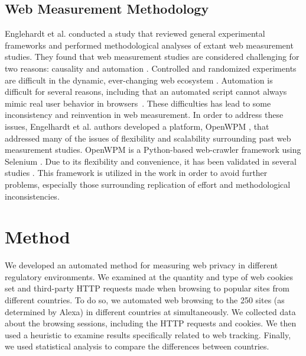 \documentclass[conference]{IEEEtran}
\newcommand{\todo}[1]{}
\renewcommand{\todo}[1]{{\color{red} TODO: {#1}}}
\begin{document}
\subsection{Web Measurement Methodology}
Englehardt et al. conducted a study that reviewed general experimental frameworks and performed methodological analyses of extant web measurement studies.  They found that web measurement studies are considered challenging for two reasons: causality and automation \cite{openwpm_article}.  Controlled and randomized experiments are difficult in the dynamic, ever-changing web ecosystem \cite{guha2010challenges}. Automation is difficult for several reasons, including that an automated script cannot always mimic real user behavior in browsers~\cite{openwpm_article}.  These difficulties has lead to some inconsistency and reinvention in web measurement. In order to address these issues, Engelhardt et al. authors developed a platform, OpenWPM \cite{openwpm}, that addressed many of the issues of flexibility and scalability surrounding past web measurement studies. 
OpenWPM is a Python-based web-crawler framework using Selenium \cite{Selenium}. Due to its flexibility and convenience, it has been validated in several studies \cite{openwpm}\cite{openwpm_article}. This framework is utilized in the work in order to avoid further problems, especially those surrounding replication of effort and methodological inconsistencies.

\section{Method}

We developed an automated method for measuring web privacy in different regulatory environments.  We examined at the quantity and type of web cookies set and third-party HTTP requests made when browsing to popular sites from different countries.  To do so, we automated web browsing to the 250 sites (as determined by Alexa) in different countries at  simultaneously.  We collected data about the browsing sessions, including the HTTP requests and cookies.  We then used a heuristic to examine results specifically related to web tracking.  Finally, we used statistical analysis to compare the differences between countries.  
\end{document}
